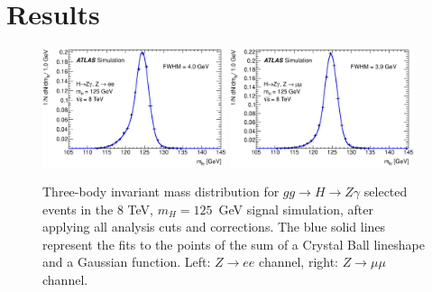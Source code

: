 \section{Results}

\begin{figure}[!htbp]
  \begin{center}
{\includegraphics[width=0.48\textwidth]{figures/PlotsSuperposedResolutionCorrections_e_mc12a_Mllg}}
{\includegraphics[width=0.48\textwidth]{figures/PlotsSuperposedResolutionCorrections_mu_mc12a_Mllg}}
\caption{Three-body invariant mass distribution for $gg\to H\to Z\gamma$
    selected events in the 8 TeV, $m_H=125$~GeV signal simulation, 
    after applying all analysis cuts and corrections. The blue solid lines 
    represent the fits to the points of the sum of a 
    Crystal Ball lineshape and a Gaussian function.
    Left: $Z\to ee$ channel, right: $Z\to\mu\mu$ channel.}
  \label{fig:signal_resolution_corrections}
  \end{center}
\end{figure}

